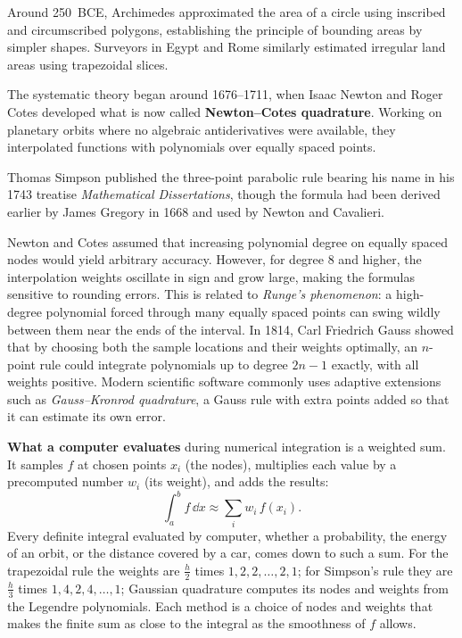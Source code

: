 \begin{historybox}
Around 250~BCE, Archimedes approximated the area of a circle using inscribed and
circumscribed polygons, establishing the principle of bounding areas by simpler shapes.
Surveyors in Egypt and Rome similarly estimated irregular land areas using trapezoidal slices.

The systematic theory began around 1676--1711, when Isaac Newton and Roger Cotes
developed what is now called \textbf{Newton--Cotes quadrature}. Working on planetary
orbits where no algebraic antiderivatives were available, they interpolated functions
with polynomials over equally spaced points.

Thomas Simpson published the three-point parabolic rule bearing his name in his 1743
treatise \emph{Mathematical Dissertations}, though the formula had been derived earlier
by James Gregory in 1668 and used by Newton and Cavalieri.

Newton and Cotes assumed that increasing polynomial degree on equally spaced nodes would
yield arbitrary accuracy. However, for degree 8 and higher, the interpolation weights
oscillate in sign and grow large, making the formulas sensitive to rounding errors.
This is related to \emph{Runge's phenomenon}: a high-degree polynomial forced through many
equally spaced points can swing wildly between them near the ends of the interval. In 1814, Carl Friedrich Gauss showed that by
choosing both the sample locations and their weights optimally, an $n$-point rule could
integrate polynomials up to degree $2n-1$ exactly, with all weights positive. Modern
scientific software commonly uses adaptive extensions such as \emph{Gauss--Kronrod quadrature},
a Gauss rule with extra points added so that it can estimate its own error.
\end{historybox}

\begin{happeningbox}
\textbf{What a computer evaluates} during numerical integration is a weighted sum. It samples $f$ at chosen points $x_i$ (the nodes), multiplies each value by a precomputed number $w_i$ (its weight), and adds the results:
\[
\int_a^b f\,\dd x \approx \sum_i w_i\, f(x_i).
\]
Every definite integral evaluated by computer, whether a probability, the energy of an orbit, or the distance covered by a car, comes down to such a sum. For the trapezoidal rule the weights are $\tfrac{h}{2}$ times $1,2,2,\dots,2,1$; for Simpson's rule they are $\tfrac{h}{3}$ times $1,4,2,4,\dots,1$; Gaussian quadrature computes its nodes and weights from the Legendre polynomials. Each method is a choice of nodes and weights that makes the finite sum as close to the integral as the smoothness of $f$ allows.
\end{happeningbox}

